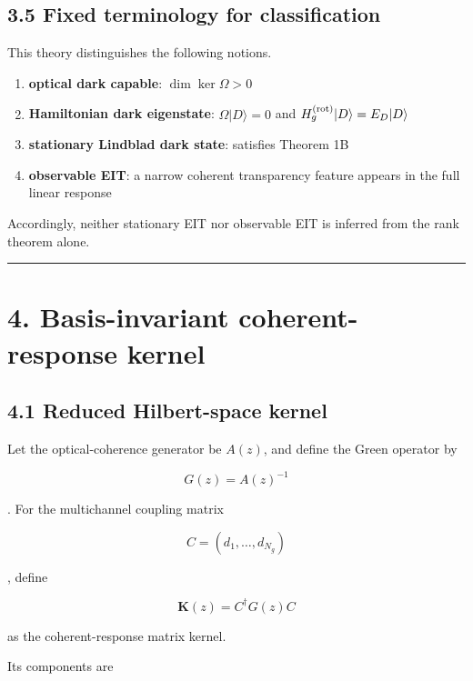 \documentclass[
  10pt,
  a4paper,
]{article}
\providecommand{\tightlist}{%
  \setlength{\itemsep}{0pt}\setlength{\parskip}{0pt}}
\begin{document}
\subsection{3.5 Fixed terminology for
classification}\label{fixed-terminology-for-classification}

This theory distinguishes the following notions.

\begin{enumerate}
\def\labelenumi{\arabic{enumi}.}
\tightlist
\item
  \textbf{optical dark capable}: \(\dim\ker\Omega>0\)
\item
  \textbf{Hamiltonian dark eigenstate}: \(\Omega|D\rangle=0\) and
  \(H_g^{(\rm rot)}|D\rangle=E_D|D\rangle\)
\item
  \textbf{stationary Lindblad dark state}: satisfies Theorem 1B
\item
  \textbf{observable EIT}: a narrow coherent transparency feature
  appears in the full linear response
\end{enumerate}

Accordingly, neither stationary EIT nor observable EIT is inferred from
the rank theorem alone.

\begin{center}\rule{0.5\linewidth}{0.5pt}\end{center}

\section{4. Basis-invariant coherent-response
kernel}\label{basis-invariant-coherent-response-kernel}

\subsection{4.1 Reduced Hilbert-space
kernel}\label{reduced-hilbert-space-kernel}

Let the optical-coherence generator be \(A(z)\), and define the Green
operator by

\[
G(z)=A(z)^{-1}
\]

. For the multichannel coupling matrix

\[
C=(d_1,\ldots,d_{N_g})
\]

, define

\[
\boxed{
\mathbf K(z)=C^\dagger G(z)C
}
\]

as the coherent-response matrix kernel.

Its components are
\end{document}
